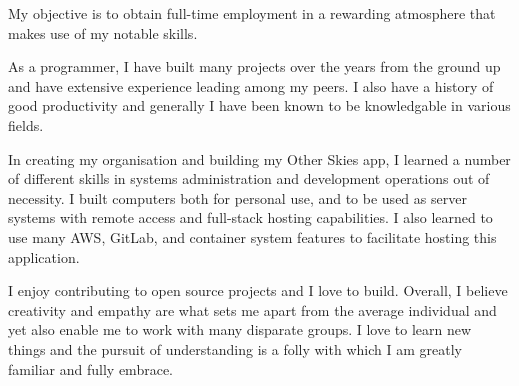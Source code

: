 
\begin{cvparagraph}
   My objective is to obtain full-time employment in a rewarding atmosphere that makes use of my
   notable skills.

   As a programmer, I have built many projects over the years from the ground up and have extensive
   experience leading among my peers. I also have a history of good productivity and generally I have
   been known to be knowledgable in various fields.

   In creating my organisation and building my Other Skies app, I learned a number of different skills
   in systems administration and development operations out of necessity. I built computers both for
   personal use, and to be used as server systems with remote access and full-stack hosting capabilities.
   I also learned to use many AWS, GitLab, and container system features to facilitate hosting this
   application.

   I enjoy contributing to open source projects and I love to build. Overall, I believe creativity
   and empathy are what sets me apart from the average individual and yet also enable me to work
   with many disparate groups. I love to learn new things and the pursuit of understanding is a folly
   with which I am greatly familiar and fully embrace.
\end{cvparagraph}
